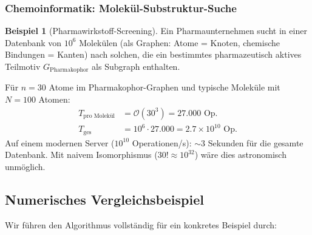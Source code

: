 ﻿\documentclass[12pt,a4paper,twoside]{article}
\theoremstyle{definition}
\newtheorem{beispiel}{Beispiel}[section]
\theoremstyle{plain}
\theoremstyle{remark}
\begin{document}
\subsubsection{Chemoinformatik: Molekül-Substruktur-Suche}

\begin{beispiel}[Pharmawirkstoff-Screening]
Ein Pharmaunternehmen sucht in einer Datenbank von
$10^6$ Molekülen (als Graphen: Atome = Knoten,
chemische Bindungen = Kanten) nach solchen,
die ein bestimmtes pharmazeutisch aktives Teilmotiv
$G_{\text{Pharmakophor}}$ als Subgraph enthalten.

Für $n = 30$ Atome im Pharmakophor-Graphen
und typische Moleküle mit $N = 100$ Atomen:
\begin{align*}
  T_{\text{pro Molekül}} &= \mathcal{O}(30^3) = 27.000 \text{ Op.} \\
  T_{\text{ges}} &= 10^6 \cdot 27.000 = 2.7 \times 10^{10} \text{ Op.}
\end{align*}
Auf einem modernen Server ($10^{10}$ Operationen/s):
$\sim 3$ Sekunden für die gesamte Datenbank.
Mit naivem Isomorphismus ($30! \approx 10^{32}$) wäre
dies astronomisch unmöglich.
\end{beispiel}

\subsection{Numerisches Vergleichsbeispiel}
\label{sub:sa_beispiel}

Wir führen den Algorithmus vollständig für ein konkretes
Beispiel durch:
\end{document}

